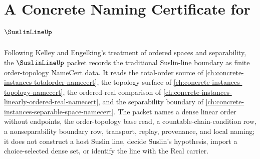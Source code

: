 \chapter{A Concrete Naming Certificate for $\SuslinLineUp$}
\label{ch:concrete-instances-suslin-line-namecert}

Following Kelley and Engelking's treatment of ordered spaces and separability, the $\SuslinLineUp$ packet records the traditional Suslin-line boundary as finite order-topology NameCert data. It reads the total-order source of \autoref{ch:concrete-instances-totalorder-namecert}, the topology surface of \autoref{ch:concrete-instances-topology-namecert}, the ordered-real comparison of \autoref{ch:concrete-instances-linearly-ordered-real-namecert}, and the separability boundary of \autoref{ch:concrete-instances-separable-space-namecert}. The packet names a dense linear order without endpoints, the order-topology base read, a countable-chain-condition row, a nonseparability boundary row, transport, replay, provenance, and local naming; it does not construct a host Suslin line, decide Suslin's hypothesis, import a choice-selected dense set, or identify the line with the Real carrier.

